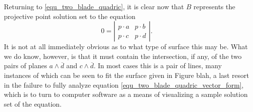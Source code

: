 \documentclass{ecgd-l}
\theoremstyle{definition}
\theoremstyle{remark}
\numberwithin{equation}{section}
\begin{document}
Returning to \eqref{equ_two_blade_quadric}, it is clear now that $B$ represents
the projective point solution set to the equation
\begin{equation}\label{equ_two_blade_quadric_vector_form}
0 = \left|\begin{array}{cc} p\cdot a & p\cdot b \\ p\cdot c & p\cdot d \end{array}\right|.
\end{equation}
It is not at all immediately obvious as to what type of surface this may be.  What we do know, however, is that it must
contain the intersection, if any, of the two pairs of planes $a\wedge\overline{d}$ and $c\wedge\overline{d}$.
In most cases this is a pair of lines, many instances of which can be seen to fit the surface
given in Figure blah, a last resort in the failure to fully analyze equation \eqref{equ_two_blade_quadric_vector_form},
which is to turn to computer software as a means of visualizing a sample solution set of the equation.
\end{document}
